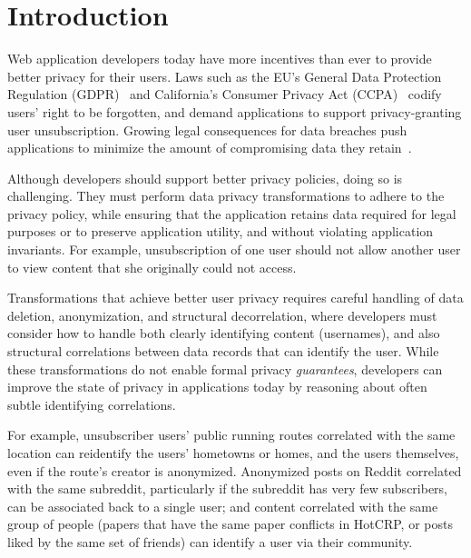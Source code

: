 \section{Introduction}
Web application developers today have more incentives than ever to provide better privacy for their
users.
%
Laws such as the EU's General Data Protection Regulation (GDPR)~\cite{eu:gdpr} and California's
Consumer Privacy Act (CCPA)~\cite{ca:privacy-act} codify users' right to be forgotten, and demand
applications to support privacy-granting user unsubscription.
%
Growing legal consequences for data breaches push applications to minimize the amount of
compromising data they retain~\cite{breach:amazon,breach:twitter, breach:fb, breach:marriott,
breach:quora}.

Although developers should support better privacy policies, doing so is challenging.  They must
perform data privacy transformations to adhere to the privacy policy, while ensuring that the
application retains data required for legal purposes or to preserve application utility, and without
violating application invariants.  
%
For example, unsubscription of one user should not allow another user to view content that she
originally could not access.

Transformations that achieve better user privacy requires careful handling of data deletion,
anonymization, and structural decorrelation, where developers must consider how to handle both
clearly identifying content (\eg usernames), and also structural correlations between data records
that can identify the user. 
While these transformations do not enable formal privacy \emph{guarantees}, developers can improve the state of privacy in applications today by reasoning about often subtle identifying correlations.

For example, unsubscriber users' public running routes correlated with the same location can
reidentify the users' hometowns or homes, and the users themselves, even if the route's creator is
anonymized. Anonymized posts on Reddit correlated with the same subreddit, particularly if the
subreddit has very few subscribers, can be associated back to a single user; and
content correlated with the same group of people (\eg papers that have the same paper conflicts in
HotCRP, or posts liked by the same set of friends) can identify a user via their community.

